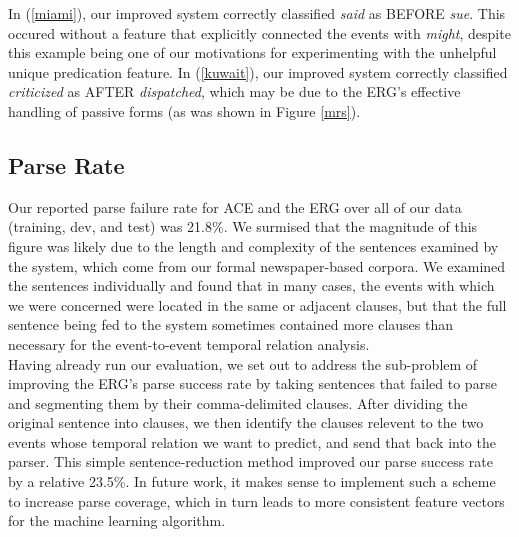 \documentclass[11pt]{article}
\begin{document}
In (\ref{miami}), our improved system correctly classified \emph{said} as BEFORE \emph{sue}. This occured without a feature that explicitly connected the events with \emph{might}, despite this example being one of our motivations for experimenting with the unhelpful unique predication feature. In (\ref{kuwait}), our improved system correctly classified \emph{criticized} as AFTER \emph{dispatched}, which may be due to the ERG's effective handling of passive forms (as was shown in Figure \ref{mrs}).



\subsection{Parse Rate}
Our reported parse failure rate for ACE and the ERG over all of our data (training, dev, and test) was 21.8\%. We surmised that the magnitude of this figure was likely due to the length and complexity of the sentences examined by the system, which come from our formal newspaper-based corpora. We examined the sentences individually and found that in many cases, the events with which we were concerned were located in the same or adjacent clauses, but that the full sentence being fed to the system sometimes contained more clauses than necessary for the event-to-event temporal relation analysis. \\\indent Having already run our evaluation, we set out to address the sub-problem of improving the ERG's parse success rate by taking sentences that failed to parse and segmenting them by their comma-delimited clauses. After dividing the original sentence into clauses, we then identify the clauses relevent to the two events whose temporal relation we want to predict, and send that back into the parser. This simple sentence-reduction method improved our parse success rate by a relative 23.5\%. In future work, it makes sense to implement such a scheme to increase parse coverage, which in turn leads to more consistent feature vectors for the machine learning algorithm.   
\end{document}
